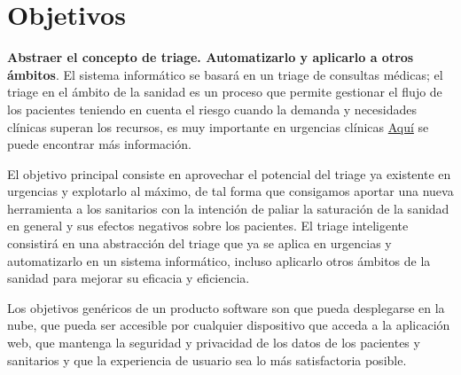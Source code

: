 \section{Objetivos}

\textbf{Abstraer el concepto de triage. Automatizarlo y aplicarlo a otros ámbitos}. El sistema informático se basará en un triage de consultas médicas; el triage en el ámbito
 de la sanidad es un proceso que permite gestionar el flujo de los pacientes teniendo en cuenta el riesgo cuando la demanda y necesidades clínicas
 superan los recursos, es muy importante en urgencias clínicas \href{https://scielo.isciii.es/scielo.php?script=sci_arttext&pid=S1137-66272010000200008}{Aquí}
 se puede encontrar más información.

 El objetivo principal consiste en aprovechar el potencial del triage ya existente en urgencias y explotarlo al máximo, de tal forma que
 consigamos aportar una nueva herramienta a los sanitarios con la intención de paliar la saturación de la sanidad en general y sus efectos negativos sobre los pacientes.
 El triage inteligente consistirá en una abstracción del triage que ya se aplica en urgencias y automatizarlo en un sistema informático, incluso aplicarlo
 otros ámbitos de la sanidad para mejorar su eficacia y eficiencia.

 Los objetivos genéricos de un producto software son que pueda desplegarse en la nube, que pueda ser accesible por cualquier dispositivo que acceda a la aplicación web,
 que mantenga la seguridad y privacidad de los datos de los pacientes y sanitarios y que la experiencia de usuario sea lo más satisfactoria posible.

